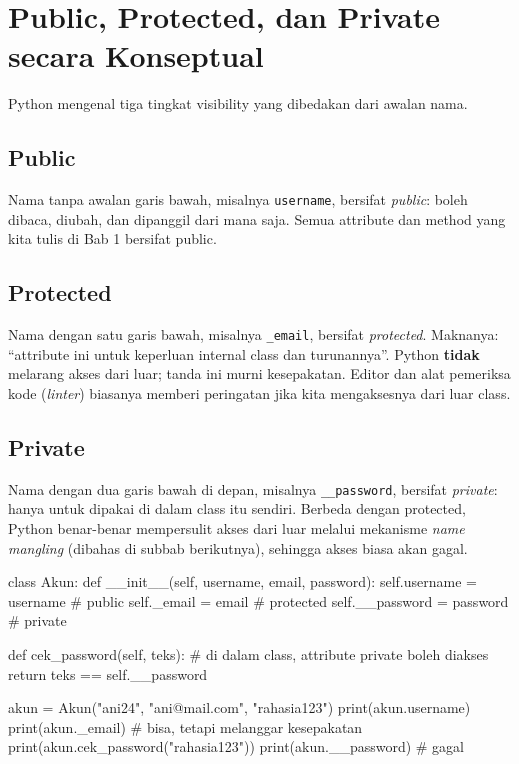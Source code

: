 \section{Public, Protected, dan Private secara Konseptual}

Python mengenal tiga tingkat visibility yang dibedakan dari awalan nama.

\subsection{Public}

Nama tanpa awalan garis bawah, misalnya \texttt{username}, bersifat \emph{public}: boleh dibaca, diubah, dan dipanggil dari mana saja. Semua attribute dan method yang kita tulis di Bab 1 bersifat public.

\subsection{Protected}

Nama dengan satu garis bawah, misalnya \texttt{\_email}, bersifat \emph{protected}. Maknanya: ``attribute ini untuk keperluan internal class dan turunannya''. Python \textbf{tidak} melarang akses dari luar; tanda ini murni kesepakatan. Editor dan alat pemeriksa kode (\emph{linter}) biasanya memberi peringatan jika kita mengaksesnya dari luar class.

\subsection{Private}

Nama dengan dua garis bawah di depan, misalnya \texttt{\_\_password}, bersifat \emph{private}: hanya untuk dipakai di dalam class itu sendiri. Berbeda dengan protected, Python benar-benar mempersulit akses dari luar melalui mekanisme \emph{name mangling} (dibahas di subbab berikutnya), sehingga akses biasa akan gagal.

\begin{kode}
class Akun:
    def __init__(self, username, email, password):
        self.username = username       # public
        self._email = email            # protected
        self.__password = password     # private

    def cek_password(self, teks):
        # di dalam class, attribute private boleh diakses
        return teks == self.__password

akun = Akun("ani24", "ani@mail.com", "rahasia123")
print(akun.username)
print(akun._email)                     # bisa, tetapi melanggar kesepakatan
print(akun.cek_password("rahasia123"))
print(akun.__password)                 # gagal
\end{kode}

